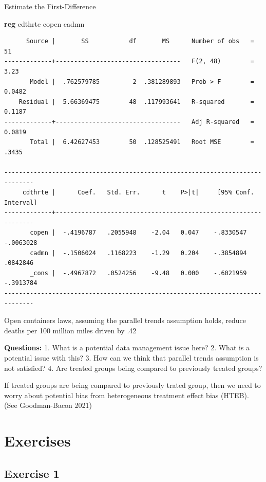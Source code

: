 \documentclass[
]{book}
\newenvironment{Shaded}{\begin{snugshade}}{\end{snugshade}}
\newcommand{\KeywordTok}[1]{\textcolor[rgb]{0.13,0.29,0.53}{\textbf{#1}}}
\newcommand{\NormalTok}[1]{#1}
\begin{document}
Estimate the First-Difference

\begin{Shaded}
\begin{Highlighting}[]
\KeywordTok{reg}\NormalTok{ cdthrte copen cadmn}
\end{Highlighting}
\end{Shaded}

\begin{verbatim}
      Source |       SS           df       MS      Number of obs   =        51
-------------+----------------------------------   F(2, 48)        =      3.23
       Model |  .762579785         2  .381289893   Prob > F        =    0.0482
    Residual |  5.66369475        48  .117993641   R-squared       =    0.1187
-------------+----------------------------------   Adj R-squared   =    0.0819
       Total |  6.42627453        50  .128525491   Root MSE        =     .3435

------------------------------------------------------------------------------
     cdthrte |      Coef.   Std. Err.      t    P>|t|     [95% Conf. Interval]
-------------+----------------------------------------------------------------
       copen |  -.4196787   .2055948    -2.04   0.047    -.8330547   -.0063028
       cadmn |  -.1506024   .1168223    -1.29   0.204    -.3854894    .0842846
       _cons |  -.4967872   .0524256    -9.48   0.000    -.6021959   -.3913784
------------------------------------------------------------------------------
\end{verbatim}

Open containers laws, assuming the parallel trends assumption holds, reduce deaths per 100 million miles driven by .42

\textbf{Questions:}
1. What is a potential data management issue here?
2. What is a potential issue with this?
3. How can we think that parallel trends assumption is not satisfied?
4. Are treated groups being compared to previously treated groups?

If treated groups are being compared to previously trated group, then we need to worry about potential bias from heterogeneous treatment effect bias (HTEB).
(See Goodman-Bacon 2021)

\section{Exercises}\label{exercises}

\subsection{Exercise 1}\label{exercise-1}
\end{document}
